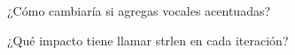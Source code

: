 
\begin{DoxyEnumerate}
\item ¿\+Cómo cambiaría si agregas vocales acentuadas?
\item ¿\+Qué impacto tiene llamar strlen en cada iteración? 
\end{DoxyEnumerate}
